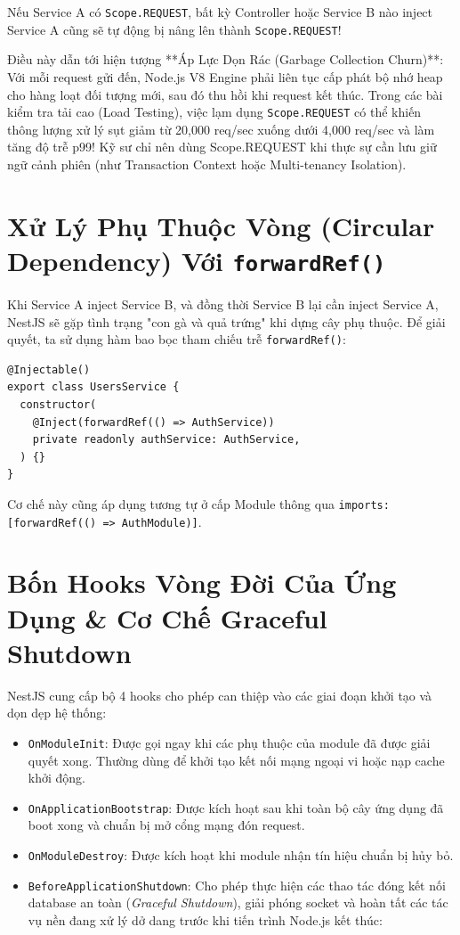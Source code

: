 \documentclass[12pt,a4paper,oneside]{book}
\begin{document}
\begin{warningbox}
  Nếu Service A có \texttt{Scope.REQUEST}, bất kỳ Controller hoặc Service B nào inject Service A cũng sẽ tự động bị nâng lên thành \texttt{Scope.REQUEST}!
  
  Điều này dẫn tới hiện tượng **Áp Lực Dọn Rác (Garbage Collection Churn)**: Với mỗi request gửi đến, Node.js V8 Engine phải liên tục cấp phát bộ nhớ heap cho hàng loạt đối tượng mới, sau đó thu hồi khi request kết thúc. Trong các bài kiểm tra tải cao (Load Testing), việc lạm dụng \texttt{Scope.REQUEST} có thể khiến thông lượng xử lý sụt giảm từ 20,000 req/sec xuống dưới 4,000 req/sec và làm tăng độ trễ p99! Kỹ sư chỉ nên dùng Scope.REQUEST khi thực sự cần lưu giữ ngữ cảnh phiên (như Transaction Context hoặc Multi-tenancy Isolation).
\end{warningbox}

\section{Xử Lý Phụ Thuộc Vòng (Circular Dependency) Với \texttt{forwardRef()}}
Khi Service A inject Service B, và đồng thời Service B lại cần inject Service A, NestJS sẽ gặp tình trạng "con gà và quả trứng" khi dựng cây phụ thuộc. Để giải quyết, ta sử dụng hàm bao bọc tham chiếu trễ \texttt{forwardRef()}:
\begin{codebox}
\begin{Verbatim}[fontsize=\small]
@Injectable()
export class UsersService {
  constructor(
    @Inject(forwardRef(() => AuthService))
    private readonly authService: AuthService,
  ) {}
}
\end{Verbatim}
\end{codebox}
Cơ chế này cũng áp dụng tương tự ở cấp Module thông qua \texttt{imports: [forwardRef(() => AuthModule)]}.

\section{Bốn Hooks Vòng Đời Của Ứng Dụng \& Cơ Chế Graceful Shutdown}
NestJS cung cấp bộ 4 hooks cho phép can thiệp vào các giai đoạn khởi tạo và dọn dẹp hệ thống:
\begin{itemize}
  \item \texttt{OnModuleInit}: Được gọi ngay khi các phụ thuộc của module đã được giải quyết xong. Thường dùng để khởi tạo kết nối mạng ngoại vi hoặc nạp cache khởi động.
  \item \texttt{OnApplicationBootstrap}: Được kích hoạt sau khi toàn bộ cây ứng dụng đã boot xong và chuẩn bị mở cổng mạng đón request.
  \item \texttt{OnModuleDestroy}: Được kích hoạt khi module nhận tín hiệu chuẩn bị hủy bỏ.
  \item \texttt{BeforeApplicationShutdown}: Cho phép thực hiện các thao tác đóng kết nối database an toàn (\textit{Graceful Shutdown}), giải phóng socket và hoàn tất các tác vụ nền đang xử lý dở dang trước khi tiến trình Node.js kết thúc:
\end{itemize}
\end{document}
